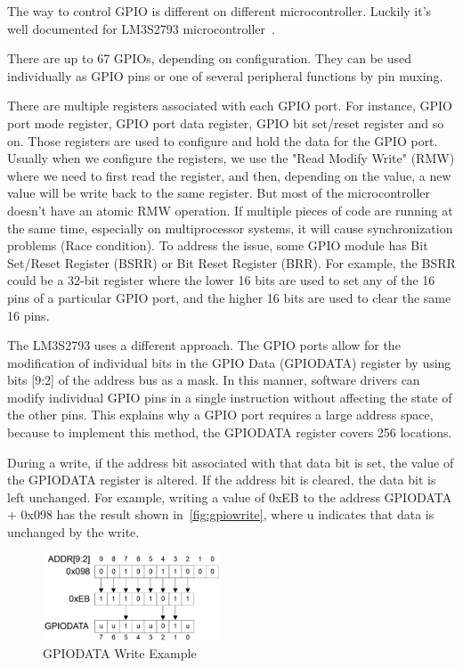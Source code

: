 The way to control GPIO is different on different microcontroller. Luckily it's well documented for LM3S2793 microcontroller~\cite{lm3s2793}. 

There are up to 67 GPIOs, depending on configuration. They can be used individually as GPIO pins or one of several peripheral functions by pin muxing.

There are multiple registers associated with each GPIO port. For instance, GPIO port mode register, GPIO port data register, GPIO bit set/reset register and so on. Those registers are used to configure and hold the data for the GPIO port. Usually when we configure the registers, we use the "Read Modify Write" (RMW) where we need to first read the register, and then, depending on the value, a new value will be write back to the same register. But most of the microcontroller doesn't have an atomic RMW operation. If multiple pieces of code are running at the same time, especially on multiprocessor systems, it will cause synchronization problems (Race condition). To address the issue, some GPIO module has Bit Set/Reset Register (BSRR) or Bit Reset Register (BRR). For example, the BSRR could be a 32-bit register where the lower 16 bits are used to set any of the 16 pins of a particular GPIO port, and the higher 16 bits are used to clear the same 16 pins.

The LM3S2793 uses a different approach. The GPIO ports allow for the modification of individual bits in the GPIO Data (GPIODATA) register by using bits [9:2] of the address bus as a mask. In this manner, software drivers can modify individual GPIO pins in a single instruction without affecting the state of the other pins. This explains why a GPIO port requires a large address space, because to implement this method, the GPIODATA register covers 256 locations. 

During a write, if the address bit associated with that data bit is set, the value of the GPIODATA register is altered. If the address bit is cleared, the data bit is left unchanged. For example, writing a value of 0xEB to the address GPIODATA + 0x098 has the result shown in~\autoref{fig:gpiowrite}, where u indicates that data is unchanged by the write. 

\begin{figure}[th]
	\includegraphics[width=0.47\textwidth]{figures/gpiowrite}
	\centering
	\caption{GPIODATA Write Example~\cite{lm3s2793}}
	\label{fig:gpiowrite}
\end{figure}

